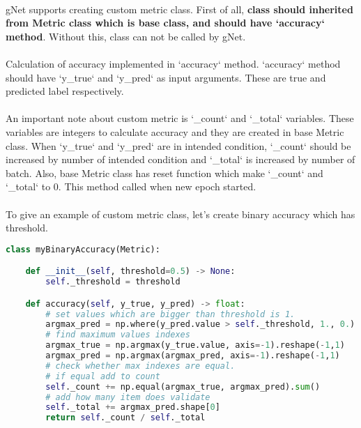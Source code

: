 \documentclass[12pt]{report}
\begin{document}
\paragraph{}
gNet supports creating custom metric class. First of all, \textbf{class should inherited from Metric class which is base class, and should have `accuracy` method}. Without this, class can not be called by gNet. 

\paragraph{}
Calculation of accuracy implemented in `accuracy` method. `accuracy` method should have `y\_true` and `y\_pred` as input arguments. These are true and predicted label respectively. 

\paragraph{}
An important note about custom metric is `\_count` and `\_total` variables. These variables are integers to calculate accuracy and they are created in base Metric class. When `y\_true` and `y\_pred` are in intended condition, `\_count` should be increased by number of intended condition and `\_total` is increased by number of batch. Also, base Metric class has reset function which make `\_count` and `\_total` to 0. This method called when new epoch started. 


\paragraph{}
To give an example of custom metric class, let's create binary accuracy which has threshold.


\begin{lstlisting}[language=Python, numbers=none, caption={Custom metric classes.}, label={lis:metric-custom-class}]
class myBinaryAccuracy(Metric):

	def __init__(self, threshold=0.5) -> None: 
		self._threshold = threshold

	def accuracy(self, y_true, y_pred) -> float:
		# set values which are bigger than threshold is 1.
		argmax_pred = np.where(y_pred.value > self._threshold, 1., 0.)
		# find maximum values indexes
		argmax_true = np.argmax(y_true.value, axis=-1).reshape(-1,1)
		argmax_pred = np.argmax(argmax_pred, axis=-1).reshape(-1,1)
		# check whether max indexes are equal. 
		# if equal add to count
		self._count += np.equal(argmax_true, argmax_pred).sum()
		# add how many item does validate
		self._total += argmax_pred.shape[0]
		return self._count / self._total   

\end{lstlisting}
\end{document}

